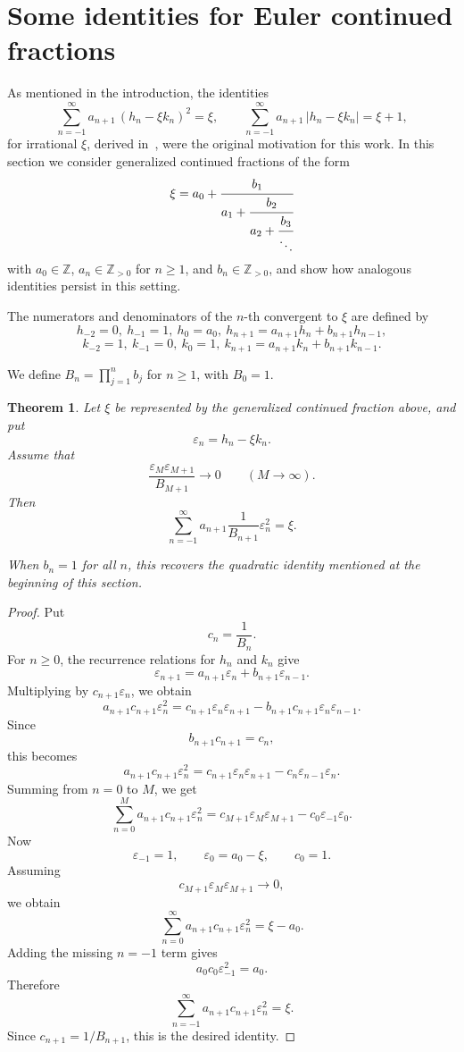 \documentclass[]{interact}
\theoremstyle{plain}
\numberwithin{equation}{section} %
\newtheorem{theorem}[thm]{Theorem}
\numberwithin{table}{section} %
\numberwithin{figure}{section}
\begin{document}
\section{Some identities for Euler continued fractions}\label{s4}

As mentioned in the introduction, the identities
\[
  \sum_{n=-1}^{\infty} a_{n+1}\,(h_n - \xi k_n)^2 = \xi,
  \qquad
  \sum_{n=-1}^{\infty} a_{n+1}\,|h_n - \xi k_n| = \xi + 1,
\]
for irrational $\xi$, derived in~\cite{kalinin2019tropical,kalinin2024legendre}, were the original
motivation for this work. In this section we consider generalized continued
fractions of the form
\[
  \xi = a_0 + \cfrac{b_1}{a_1 + \cfrac{b_2}{a_2 + \cfrac{b_3}{\ddots}}}
\]
with \(a_0\in\mathbb Z\), \(a_n\in\mathbb Z_{>0}\) for \(n\ge1\), and
\(b_n\in\mathbb Z_{>0}\), and show how analogous identities persist
in this setting.

The numerators and denominators of the $n$-th convergent to $\xi$ are defined by
$$h_{-2}=0,\ h_{-1}=1,\  h_0=a_0, \ h_{n+1}=a_{n+1}h_n+b_{n+1} h_{n-1},$$
$$k_{-2}=1,\ k_{-1}=0,\  k_0=1, \ k_{n+1}=a_{n+1}k_n+b_{n+1} k_{n-1}.$$

We define $B_n=\prod_{j=1}^n b_j$ for $n\geq 1$, with $B_{0}=1$.

\begin{theorem}\label{th6}
Let \(\xi\) be represented by the generalized continued fraction above, and put
\[
\varepsilon_n=h_n-\xi k_n.
\]
Assume that
\[
\frac{\varepsilon_M\varepsilon_{M+1}}{B_{M+1}}\to0
\qquad (M\to\infty).
\]
Then
\[
\sum_{n=-1}^{\infty}
a_{n+1}\frac{1}{B_{n+1}}\varepsilon_n^2
=
\xi.
\]

When \(b_n=1\) for all \(n\), this recovers the quadratic identity mentioned at
the beginning of this section.
\end{theorem}



\begin{proof}
Put
\[
c_n=\frac1{B_n}.
\]
For \(n\ge0\), the recurrence relations for \(h_n\) and \(k_n\) give
\[
\varepsilon_{n+1}
=
a_{n+1}\varepsilon_n+b_{n+1}\varepsilon_{n-1}.
\]
Multiplying by \(c_{n+1}\varepsilon_n\), we obtain
\[
a_{n+1}c_{n+1}\varepsilon_n^2
=
c_{n+1}\varepsilon_n\varepsilon_{n+1}
-
b_{n+1}c_{n+1}\varepsilon_n\varepsilon_{n-1}.
\]
Since
\[
b_{n+1}c_{n+1}=c_n,
\]
this becomes
\[
a_{n+1}c_{n+1}\varepsilon_n^2
=
c_{n+1}\varepsilon_n\varepsilon_{n+1}
-
c_n\varepsilon_{n-1}\varepsilon_n.
\]
Summing from \(n=0\) to \(M\), we get
\[
\sum_{n=0}^{M}a_{n+1}c_{n+1}\varepsilon_n^2
=
c_{M+1}\varepsilon_M\varepsilon_{M+1}
-
c_0\varepsilon_{-1}\varepsilon_0.
\]
Now
\[
\varepsilon_{-1}=1,
\qquad
\varepsilon_0=a_0-\xi,
\qquad
c_0=1.
\]
Assuming
\[
c_{M+1}\varepsilon_M\varepsilon_{M+1}\to0,
\]
we obtain
\[
\sum_{n=0}^{\infty}a_{n+1}c_{n+1}\varepsilon_n^2
=
\xi-a_0.
\]
Adding the missing \(n=-1\) term gives
\[
a_0c_0\varepsilon_{-1}^2=a_0.
\]
Therefore
\[
\sum_{n=-1}^{\infty}a_{n+1}c_{n+1}\varepsilon_n^2=\xi.
\]
Since \(c_{n+1}=1/B_{n+1}\), this is the desired identity.
\end{proof}
\end{document}
